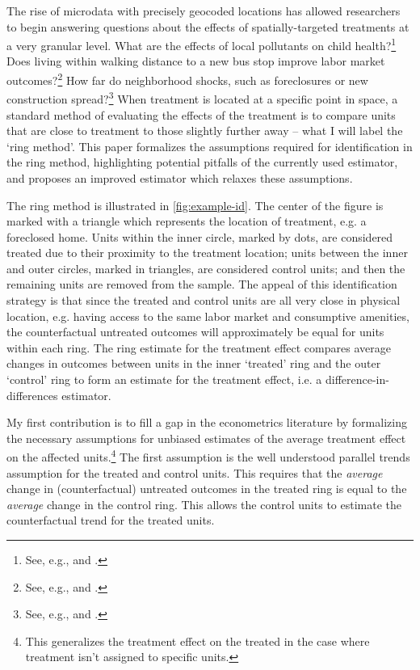 \documentclass[10pt]{article}
\begin{document}
The rise of microdata with precisely geocoded locations has allowed researchers to begin answering questions about the effects of spatially-targeted treatments at a very granular level. What are the effects of local pollutants on child health?\footnote{See, e.g., \citet{Currie_Davis_Greenstone_Walker_2015} and \citet{Marcus_2021}.} Does living within walking distance to a new bus stop improve labor market outcomes?\footnote{See, e.g., \citet{Gibbons_Machin_2005} and \citet{Billings_2011}.} How far do neighborhood shocks, such as foreclosures or new construction spread?\footnote{See, e.g., \citet{Asquith_Mast_Reed_2021,Cui_Walsh_2015,Gerardi_Rosenblatt_Willen_Yao_2015} and \citet{Campbell_Giglio_Pathak_2011}.} When treatment is located at a specific point in space, a standard method of evaluating the effects of the treatment is to compare units that are close to treatment to those slightly further away -- what I will label the `ring method'. This paper formalizes the assumptions required for identification in the ring method, highlighting potential pitfalls of the currently used estimator, and proposes an improved estimator which relaxes these assumptions. 

The ring method is illustrated in \autoref{fig:example-id}. The center of the figure is marked with a triangle which represents the location of treatment, e.g. a foreclosed home. Units within the inner circle, marked by dots, are considered treated due to their proximity to the treatment location; units between the inner and outer circles, marked in triangles, are considered control units; and then the remaining units are removed from the sample. The appeal of this identification strategy is that since the treated and control units are all very close in physical location, e.g. having access to the same labor market and consumptive amenities, the counterfactual untreated outcomes will approximately be equal for units within each ring. The ring estimate for the treatment effect compares average changes in outcomes between units in the inner `treated' ring and the outer `control' ring to form an estimate for the treatment effect, i.e. a difference-in-differences estimator. 

My first contribution is to fill a gap in the econometrics literature by formalizing the necessary assumptions for unbiased estimates of the average treatment effect on the affected units.\footnote{This generalizes the treatment effect on the treated in the case where treatment isn't assigned to specific units.} The first assumption is the well understood parallel trends assumption for the treated and control units. This requires that the \emph{average} change in (counterfactual) untreated outcomes in the treated ring is equal to the \emph{average} change in the control ring. This allows the control units to estimate the counterfactual trend for the treated units. 
\end{document}
